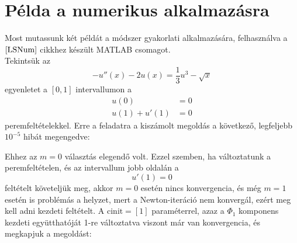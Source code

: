 \documentclass[oneside, titlepage, 12pt, a4paper]{report}
\begin{document}
\section{Példa a numerikus alkalmazásra}
\label{sec:examples}

Most mutassunk két példát a módszer gyakorlati alkalmazására, felhasználva a $\cite{LSNum}$ cikkhez készült MATLAB csomagot. \\
Tekintsük az
\begin{equation*}
-u''(x) - 2u(x) = \frac{1}{3} u^3 - \sqrt{x}
\end{equation*}
egyenletet a $[0, 1]$ intervallumon a
\begin{align*}
u(0) &= 0 \\
u(1) + u'(1) &= 0
\end{align*}
peremfeltételekkel. Erre a feladatra a kiszámolt megoldás a következő, legfeljebb $10^{-5}$ hibát megengedve:
\begin{center}
\end{center}
Ehhez az $m = 0$ választás elegendő volt. Ezzel szemben, ha változtatunk a peremfeltételen, és az intervallum jobb oldalán a
\begin{equation*}
u'(1) = 0
\end{equation*}
feltételt követeljük meg, akkor $m=0$ esetén nincs konvergencia, és még $m=1$ esetén is problémás a helyzet, mert a Newton-iteráció nem konvergál, ezért meg kell adni kezdeti feltételt. A 
$\text{cinit} = [1]$ paraméterrel, azaz a $\Phi_1$ komponens kezdeti együtthatóját 1-re változtatva viszont már van konvergencia, és megkapjuk a megoldást:
\begin{center}
\end{center}



 

 
\end{document}

